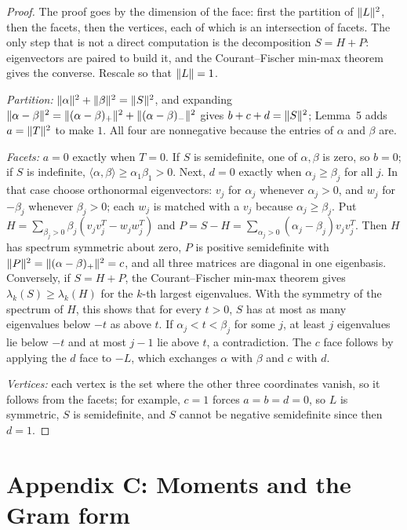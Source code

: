 \begin{proof}
\leanok
{}
The proof goes by the dimension of the face: first the partition of
$\lVert L\rVert^2$, then the facets, then the vertices, each of which is an
intersection of facets. The only step that is not a direct computation is
the decomposition $S=H+P$: eigenvectors are paired to build it, and the
Courant--Fischer min-max theorem gives the converse. Rescale so that
$\lVert L\rVert=1$.

\emph{Partition:}
$\lVert \alpha\rVert^2+\lVert \beta\rVert^2=\lVert S\rVert^2$, and expanding
$\lVert \alpha-\beta\rVert^2=\lVert (\alpha-\beta)_+\rVert^2+\lVert (\alpha-\beta)_-\rVert^2$
gives $b+c+d=\lVert S\rVert^2$; Lemma~5 adds $a=\lVert T\rVert^2$ to make $1$. All four
are nonnegative because the entries of $\alpha$ and $\beta$ are.

\emph{Facets:} $a=0$ exactly when $T=0$. If $S$ is semidefinite, one of
$\alpha,\beta$ is zero, so $b=0$; if $S$ is indefinite,
$\langle\alpha,\beta\rangle\ge\alpha_1\beta_1>0$. Next, $d=0$ exactly when
$\alpha_j\ge\beta_j$ for all $j$. In that case choose orthonormal
eigenvectors: $v_j$ for $\alpha_j$ whenever $\alpha_j>0$, and $w_j$ for
$-\beta_j$ whenever $\beta_j>0$; each $w_j$ is matched with a $v_j$
because $\alpha_j\ge\beta_j$. Put
$H=\sum_{\beta_j>0}\beta_j(v_jv_j^T-w_jw_j^T)$ and
$P=S-H=\sum_{\alpha_j>0}(\alpha_j-\beta_j)v_jv_j^T$. Then $H$ has spectrum
symmetric about zero, $P$ is positive semidefinite with
$\lVert P\rVert^2=\lVert (\alpha-\beta)_+\rVert^2=c$, and all three matrices are
diagonal in one eigenbasis. Conversely, if $S=H+P$, the Courant--Fischer
min-max theorem gives $\lambda_k(S)\ge\lambda_k(H)$ for the $k$-th largest
eigenvalues. With the symmetry of the spectrum of $H$, this shows that
for every $t>0$, $S$ has at most as many eigenvalues below $-t$ as above
$t$. If $\alpha_j<t<\beta_j$ for some $j$, at least $j$ eigenvalues lie
below $-t$ and at most $j-1$ lie above $t$, a contradiction. The $c$ face
follows by applying the $d$ face to $-L$, which exchanges $\alpha$ with
$\beta$ and $c$ with $d$.

\emph{Vertices:} each vertex is the set where
the other three coordinates vanish, so it follows from the facets; for
example, $c=1$ forces $a=b=d=0$, so $L$ is symmetric, $S$ is
semidefinite, and $S$ cannot be negative semidefinite since then $d=1$.
\end{proof}

\chapter{Appendix C: Moments and the Gram form}

